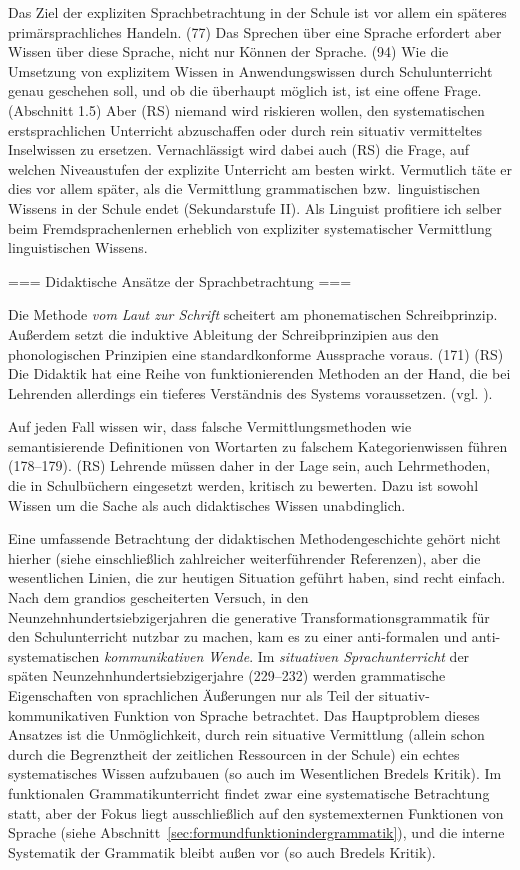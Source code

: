 Das Ziel der expliziten Sprachbetrachtung in der Schule ist vor allem ein späteres primärsprachliches Handeln. (77)
Das Sprechen über eine Sprache erfordert aber Wissen über diese Sprache, nicht nur Können der Sprache. (94)
Wie die Umsetzung von explizitem Wissen in Anwendungswissen durch Schulunterricht genau geschehen soll, und ob die überhaupt möglich ist, ist eine offene Frage. (Abschnitt 1.5) Aber (RS) niemand wird riskieren wollen, den systematischen erstsprachlichen Unterricht abzuschaffen oder durch rein situativ vermitteltes Inselwissen zu ersetzen. Vernachlässigt wird dabei auch (RS) die Frage, auf welchen Niveaustufen der explizite Unterricht am besten wirkt. Vermutlich täte er dies vor allem später, als die Vermittlung grammatischen bzw.\ linguistischen Wissens in der Schule endet (Sekundarstufe II). Als Linguist profitiere ich selber \zB beim Fremdsprachenlernen erheblich von expliziter systematischer Vermittlung linguistischen Wissens.

=== Didaktische Ansätze der Sprachbetrachtung ===

Die Methode \textit{vom Laut zur Schrift} scheitert am phonematischen Schreibprinzip.
Außerdem setzt die induktive Ableitung der Schreibprinzipien aus den phonologischen Prinzipien eine standardkonforme Aussprache voraus. (171)
(RS) Die Didaktik hat eine Reihe von funktionierenden Methoden an der Hand, die bei Lehrenden allerdings ein tieferes Verständnis des Systems voraussetzen. (vgl. \citealt[Abschnit~2.1]{Bredel2013}).

Auf jeden Fall wissen wir, dass falsche Vermittlungsmethoden wie semantisierende Definitionen von Wortarten zu falschem Kategorienwissen führen (178--179). (RS) Lehrende müssen daher in der Lage sein, auch Lehrmethoden, die in Schulbüchern eingesetzt werden, kritisch zu bewerten. Dazu ist sowohl Wissen um die Sache als auch didaktisches Wissen unabdinglich.

Eine umfassende Betrachtung der didaktischen Methodengeschichte gehört nicht hierher (siehe \citealt[Abschnitt~3.1.]{Bredel2013} einschließlich zahlreicher weiterführender Referenzen), aber die wesentlichen Linien, die zur heutigen Situation geführt haben, sind recht einfach.
Nach dem grandios gescheiterten Versuch, in den Neunzehnhundertsiebzigerjahren die generative Transformationsgrammatik für den Schulunterricht nutzbar zu machen, kam es zu einer anti-formalen und anti-systematischen \textit{kommunikativen Wende}.
Im \textit{situativen Sprachunterricht} der späten Neunzehnhundertsiebzigerjahre (229--232) werden grammatische Eigenschaften von sprachlichen Äußerungen nur als Teil der situativ-kommunikativen Funktion von Sprache betrachtet.
Das Hauptproblem dieses Ansatzes ist die Unmöglichkeit, durch rein situative Vermittlung (allein schon durch die Begrenztheit der zeitlichen Ressourcen in der Schule) ein echtes systematisches Wissen aufzubauen (so auch im Wesentlichen Bredels Kritik).
Im funktionalen Grammatikunterricht findet zwar eine systematische Betrachtung statt, aber der Fokus liegt ausschließlich auf den systemexternen Funktionen von Sprache (siehe Abschnitt~\ref{sec:formundfunktionindergrammatik}), und die interne Systematik der Grammatik bleibt außen vor (so auch Bredels Kritik).

